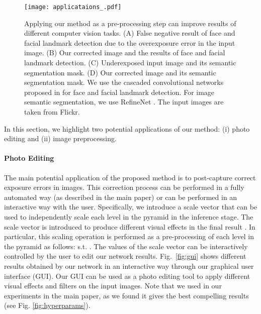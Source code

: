 \documentclass[final]{cvpr}
\begin{document}
 \begin{figure*}
 \centering
 \texttt{[image: applicataions\_.pdf]}
 \vspace{-2mm}
 \caption{Applying our method as a pre-processing step can improve results of different computer vision tasks. (A) False negative result of face and facial landmark detection due to the overexposure error in the input image. (B) Our corrected image and the results of face and facial landmark detection. (C) Underexposed input image and its semantic segmentation mask. (D) Our corrected image and its semantic segmentation mask. We use the cascaded convolutional networks proposed in \cite{zhang2016joint} for face and facial landmark detection. For image semantic segmentation, we use RefineNet \cite{Lin:2017:RefineNet, lin2019refinenet}. The input images are taken from Flickr.\vspace{-2mm}}
 \label{fig:applications}
 \end{figure*}
 
In this section, we highlight two potential applications of our method: (i) photo editing and (ii) image preprocessing.
 
\paragraph{Photo Editing}
The main potential application of the proposed method is to post-capture correct exposure errors in images. This correction process can be performed in a fully automated way (as described in the main paper) or can be performed in an interactive way with the user. Specifically, we introduce a scale vector  that can be used to independently scale each level in the pyramid  in the inference stage. The scale vector  is introduced to produce different visual effects in the final result . In particular, this scaling operation is performed as a pre-processing of each level in the pyramid  as follows:  s.t. . 
The values of the scale vector  can be interactively controlled by the user to edit our network results. Fig.\ \ref{fig:gui} shows different results obtained by our network in an interactive way through our graphical user interface (GUI). Our GUI can be used as a photo editing tool to apply different visual effects and filters on the input images. Note that we used  in our experiments in the main paper, as we found it gives the best compelling results (see Fig. \ref{fig:hyperparams}). 
\end{document}
